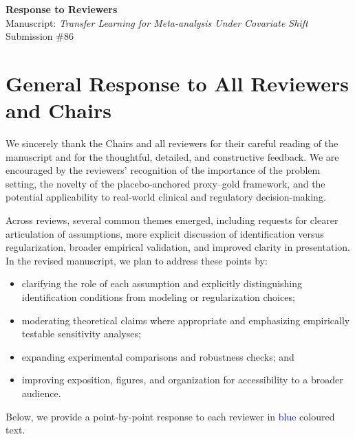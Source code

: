 \documentclass[11pt]{article}
\begin{document}
\begin{center}
{\Large \textbf{Response to Reviewers}}\\[1ex]
Manuscript: \emph{Transfer Learning for Meta-analysis Under Covariate Shift}\\
Submission \#86
\end{center}

\vspace{1em}

\section*{General Response to All Reviewers and Chairs}

We sincerely thank the Chairs and all reviewers for their careful reading of the manuscript and for the thoughtful, detailed, and constructive feedback. 
We are encouraged by the reviewers’ recognition of the importance of the problem setting, the novelty of the placebo-anchored proxy--gold framework, and the potential applicability to real-world clinical and regulatory decision-making.

Across reviews, several common themes emerged, including requests for clearer articulation of assumptions, more explicit discussion of identification versus regularization, broader empirical validation, and improved clarity in presentation. 
In the revised manuscript, we plan to address these points by:
\begin{itemize}
    \item clarifying the role of each assumption and explicitly distinguishing identification conditions from modeling or regularization choices;
    \item moderating theoretical claims where appropriate and emphasizing empirically testable sensitivity analyses;
    \item expanding experimental comparisons and robustness checks; and
    \item improving exposition, figures, and organization for accessibility to a broader audience.
\end{itemize}

Below, we provide a point-by-point response to each reviewer in \textcolor{blue}{blue} coloured text.

\clearpage




\end{document}
